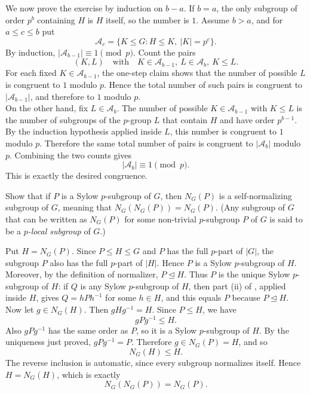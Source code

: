 \documentclass[../Odyssey_Project.tex]{subfiles}
\begin{document}
\begin{solution}
We now prove the exercise by induction on $b-a$. If $b=a$, the only subgroup of order $p^b$ containing $H$ is $H$ itself, so the number is $1$. Assume $b>a$, and for $a\leq c\leq b$ put
\[
    \mathcal{A}_c=\{K\leq G:H\leq K,\ |K|=p^c\}.
\]
By induction, $|\mathcal{A}_{b-1}|\equiv 1\pmod{p}$. Count the pairs
\[
    (K,L)\quad\text{with}\quad K\in\mathcal{A}_{b-1},\ L\in\mathcal{A}_b,\ K\leq L.
\]
For each fixed $K\in\mathcal{A}_{b-1}$, the one-step claim shows that the number of possible $L$ is congruent to $1$ modulo $p$. Hence the total number of such pairs is congruent to $|\mathcal{A}_{b-1}|$, and therefore to $1$ modulo $p$.\\
On the other hand, fix $L\in\mathcal{A}_b$. The number of possible $K\in\mathcal{A}_{b-1}$ with $K\leq L$ is the number of subgroups of the $p$-group $L$ that contain $H$ and have order $p^{b-1}$. By the induction hypothesis applied inside $L$, this number is congruent to $1$ modulo $p$. Therefore the same total number of pairs is congruent to $|\mathcal{A}_b|$ modulo $p$. Combining the two counts gives
\[
    |\mathcal{A}_b|\equiv 1\pmod{p}.
\]
This is exactly the desired congruence.
\end{solution}

\begin{exercise}
\label{ex:7.5}
Show that if $P$ is a Sylow $p$-subgroup of $G$, then $N_G(P)$ is a self-normalizing subgroup of $G$, meaning that $N_G(N_G(P)) = N_G(P)$. (Any subgroup of $G$ that can be written as $N_G(P)$ for some non-trivial $p$-subgroup $P$ of $G$ is said to be a \emph{$p$-local subgroup} of $G$.)
\end{exercise}
\begin{solution}
Put $H=N_G(P)$. Since $P\leq H\leq G$ and $P$ has the full $p$-part of $|G|$, the subgroup $P$ also has the full $p$-part of $|H|$. Hence $P$ is a Sylow $p$-subgroup of $H$. Moreover, by the definition of normalizer, $P\trianglelefteq H$. Thus $P$ is the unique Sylow $p$-subgroup of $H$: if $Q$ is any Sylow $p$-subgroup of $H$, then part (ii) of , applied inside $H$, gives $Q=hPh^{-1}$ for some $h\in H$, and this equals $P$ because $P\trianglelefteq H$.\\
Now let $g\in N_G(H)$. Then $gHg^{-1}=H$. Since $P\leq H$, we have
\[
    gPg^{-1}\leq H.
\]
Also $gPg^{-1}$ has the same order as $P$, so it is a Sylow $p$-subgroup of $H$. By the uniqueness just proved, $gPg^{-1}=P$. Therefore $g\in N_G(P)=H$, and so
\[
    N_G(H)\leq H.
\]
The reverse inclusion is automatic, since every subgroup normalizes itself. Hence $H=N_G(H)$, which is exactly
\[
    N_G(N_G(P))=N_G(P).
\]
\end{solution}
\end{document}
